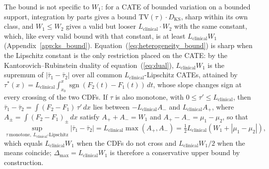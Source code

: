 \documentclass[AMA,Times1COL]{WileyNJDv5}
\begin{document}
The bound is not specific to $W_1$: for a CATE of bounded variation on a bounded support, integration by parts gives a bound $\mathrm{TV}(\tau) \cdot D_{\text{KS}}$, sharp within its own class, and $W_1 \leq W_2$ gives a valid but looser $L_{\text{clinical}} \cdot W_2$ with the same constant, which, like every valid bound with that constant, is at least $L_{\text{clinical}} W_1$ (Appendix~\ref{app:ks_bound}).\cite{villani2009} Equation~(\ref{eq:heterogeneity_bound}) is sharp when the Lipschitz constant is the only restriction placed on the CATE: by the Kantorovich--Rubinstein duality of equation~(\ref{eq:dual}), $L_{\text{clinical}} W_1$ is the supremum of $|\bar{\tau}_1 - \bar{\tau}_2|$ over all common $L_{\text{clinical}}$-Lipschitz CATEs, attained by $\tau^*(x) = L_{\text{clinical}} \int_{x_0}^{x} \operatorname{sgn}(F_2(t) - F_1(t))\,dt$, whose slope changes sign at every crossing of the two CDFs. If $\tau$ is also monotone, with $0 \leq \tau' \leq L_{\text{clinical}}$, then $\bar{\tau}_1 - \bar{\tau}_2 = \int (F_2 - F_1)\,\tau'\,dx$ lies between $-L_{\text{clinical}} A_-$ and $L_{\text{clinical}} A_+$, where $A_\pm = \int (F_2 - F_1)_\pm\,dx$ satisfy $A_+ + A_- = W_1$ and $A_+ - A_- = \mu_1 - \mu_2$, so that
\begin{equation}
\sup_{\tau\ \text{monotone},\ L_{\text{clinical}}\text{-Lipschitz}} |\bar{\tau}_1 - \bar{\tau}_2| = L_{\text{clinical}} \max(A_+, A_-) = \tfrac{1}{2} L_{\text{clinical}} \left( W_1 + |\mu_1 - \mu_2| \right),
\label{eq:mono_bound}
\end{equation}
which equals $L_{\text{clinical}} W_1$ when the CDFs do not cross and $L_{\text{clinical}} W_1 / 2$ when the means coincide; $\Delta_{\max} = L_{\text{clinical}} W_1$ is therefore a conservative upper bound by construction.
\end{document}
